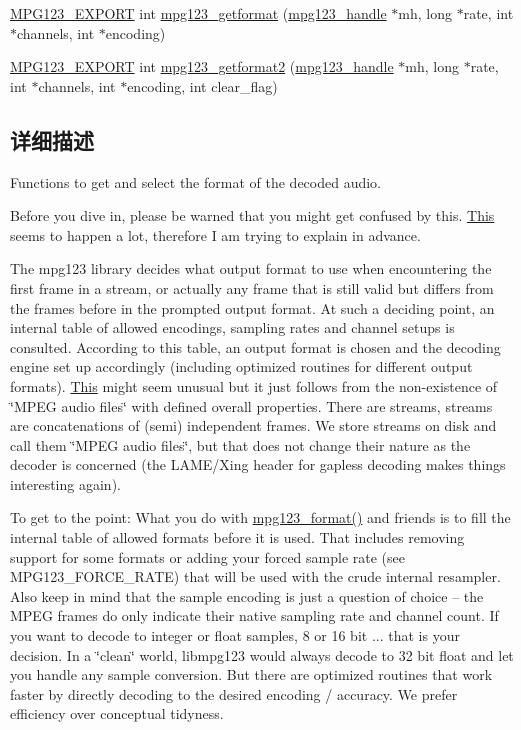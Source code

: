 \begin{DoxyCompactItemize}
\hyperlink{mpg123_8h_a2ba98cfba3f760879df70e755b2a61cc}{M\+P\+G123\+\_\+\+E\+X\+P\+O\+RT} int \hyperlink{group__mpg123__output_gae5e04c7522d620e122009db359cc6dc5}{mpg123\+\_\+getformat} (\hyperlink{group__mpg123__init_ga6728e2839a395f3a07d4514da659faca}{mpg123\+\_\+handle} $\ast$mh, long $\ast$rate, int $\ast$channels, int $\ast$encoding)
\item 
\hyperlink{mpg123_8h_a2ba98cfba3f760879df70e755b2a61cc}{M\+P\+G123\+\_\+\+E\+X\+P\+O\+RT} int \hyperlink{group__mpg123__output_gadf21a63d9ab2fc87e271962f6f583876}{mpg123\+\_\+getformat2} (\hyperlink{group__mpg123__init_ga6728e2839a395f3a07d4514da659faca}{mpg123\+\_\+handle} $\ast$mh, long $\ast$rate, int $\ast$channels, int $\ast$encoding, int clear\+\_\+flag)
\end{DoxyCompactItemize}


\subsection{详细描述}
Functions to get and select the format of the decoded audio.

Before you dive in, please be warned that you might get confused by this. \hyperlink{namespace_this}{This} seems to happen a lot, therefore I am trying to explain in advance.

The mpg123 library decides what output format to use when encountering the first frame in a stream, or actually any frame that is still valid but differs from the frames before in the prompted output format. At such a deciding point, an internal table of allowed encodings, sampling rates and channel setups is consulted. According to this table, an output format is chosen and the decoding engine set up accordingly (including optimized routines for different output formats). \hyperlink{namespace_this}{This} might seem unusual but it just follows from the non-\/existence of \char`\"{}\+M\+P\+E\+G audio files\char`\"{} with defined overall properties. There are streams, streams are concatenations of (semi) independent frames. We store streams on disk and call them \char`\"{}\+M\+P\+E\+G audio files\char`\"{}, but that does not change their nature as the decoder is concerned (the L\+A\+M\+E/\+Xing header for gapless decoding makes things interesting again).

To get to the point\+: What you do with \hyperlink{group__mpg123__output_gadad5794afc300a997e517dbe397dc2c7}{mpg123\+\_\+format()} and friends is to fill the internal table of allowed formats before it is used. That includes removing support for some formats or adding your forced sample rate (see M\+P\+G123\+\_\+\+F\+O\+R\+C\+E\+\_\+\+R\+A\+TE) that will be used with the crude internal resampler. Also keep in mind that the sample encoding is just a question of choice -- the M\+P\+EG frames do only indicate their native sampling rate and channel count. If you want to decode to integer or float samples, 8 or 16 bit ... that is your decision. In a \char`\"{}clean\char`\"{} world, libmpg123 would always decode to 32 bit float and let you handle any sample conversion. But there are optimized routines that work faster by directly decoding to the desired encoding / accuracy. We prefer efficiency over conceptual tidyness.

